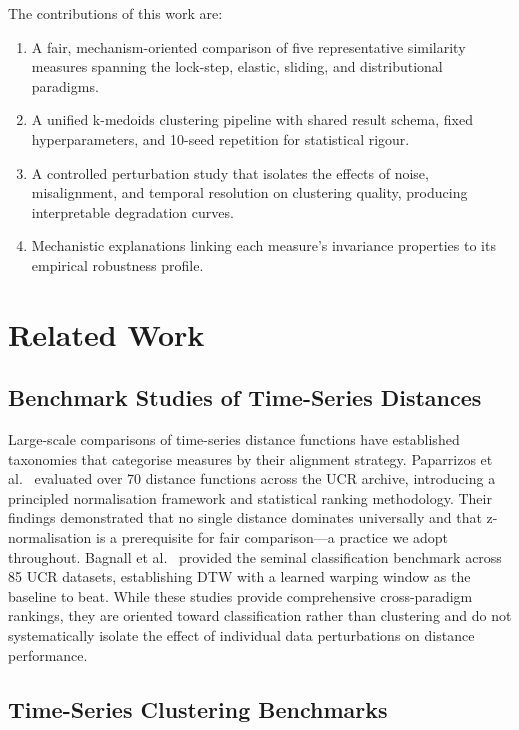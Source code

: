 The contributions of this work are:
\begin{enumerate}
    \item A fair, mechanism-oriented comparison of five representative similarity measures spanning the lock-step, elastic, sliding, and distributional paradigms.
    \item A unified k-medoids clustering pipeline with shared result schema, fixed hyperparameters, and 10-seed repetition for statistical rigour.
    \item A controlled perturbation study that isolates the effects of noise, misalignment, and temporal resolution on clustering quality, producing interpretable degradation curves.
    \item Mechanistic explanations linking each measure's invariance properties to its empirical robustness profile.
\end{enumerate}

\section{Related Work}\label{sec:related-work}

\subsection{Benchmark Studies of Time-Series Distances}\label{sec:rw-distance-benchmarks}

Large-scale comparisons of time-series distance functions have established taxonomies that categorise measures by their alignment strategy.
Paparrizos et al.~\cite{paparrizos2025tscbenchmark} evaluated over 70 distance functions across the UCR archive, introducing a principled normalisation framework and statistical ranking methodology.
Their findings demonstrated that no single distance dominates universally and that z-normalisation is a prerequisite for fair comparison---a practice we adopt throughout.
Bagnall et al.~\cite{bagnall2017bakeoff} provided the seminal classification benchmark across 85 UCR datasets, establishing DTW with a learned warping window as the baseline to beat.
While these studies provide comprehensive cross-paradigm rankings, they are oriented toward classification rather than clustering and do not systematically isolate the effect of individual data perturbations on distance performance.

\subsection{Time-Series Clustering Benchmarks}\label{sec:rw-clustering-benchmarks}

